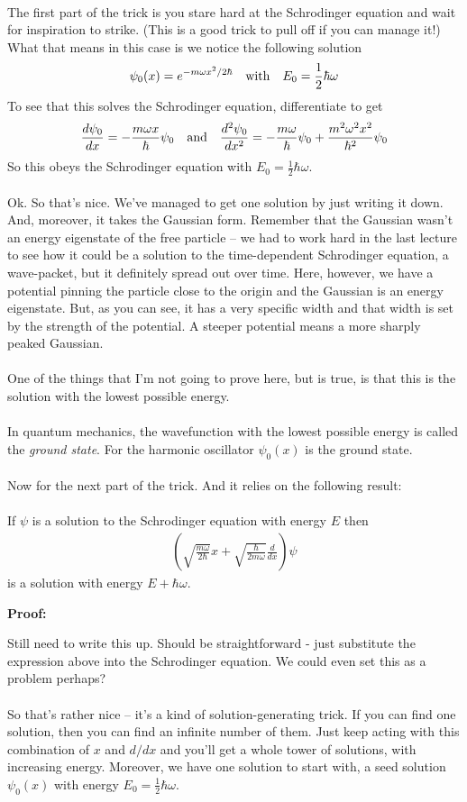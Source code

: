 \documentclass[12pt]{article}
\def\be{\begin{eqnarray}}
\def\ee{\end{eqnarray}}
\newcommand{\nn}{\nonumber}
\newcommand\para{\paragraph{}}
\newcommand{\ft}[2]{{\textstyle\frac{#1}{#2}}}
\newcommand{\co}{\color{olive}}
\newcommand{\cblue}{\color{blue}}
\begin{document}
\para
The first part of the trick is you stare hard at the Schrodinger equation and wait for inspiration to strike. (This is a good trick to pull off if you can manage it!) What that means in this case is {\co we notice the following solution
%
\be \psi_0(x) = e^{-m\omega x^2/2\hbar} \ \ \ {\rm with}\ \ \ E_0=\frac{1}{2}\hbar\omega\nn\ee
%
}To see that this solves the Schrodinger equation, differentiate to get {\co
%
\be \frac{d\psi_0}{dx} = -\frac{m\omega x}{\hbar}\psi_0\ \ \ {\rm and}\ \ \ \frac{d^2\psi_0}{dx^2} = -\frac{m\omega}{\hbar}\psi_0 + \frac{m^2\omega^2 x^2}{\hbar^2}\psi_0\nn\ee
%
So this obeys the Schrodinger equation with $E_0=\ft 12 \hbar \omega$.}

\para
Ok. So that's nice. We've managed to get one solution by just writing it down. And, moreover, it takes the Gaussian form. Remember that the Gaussian wasn't an energy eigenstate of the free particle -- we had to work hard in the last lecture to see how it could be a solution to the time-dependent Schrodinger equation, a wave-packet, but it definitely spread out over time. Here, however, we have a potential pinning the particle close to the origin and the Gaussian is an energy eigenstate. But, as you can see, it has a very specific width and that width is set by the strength of the potential. A steeper potential means a more sharply peaked Gaussian. 

\para

One of the things that I'm not going to prove here, but is true, is that this is the solution with the lowest possible energy. 

\para
{\co In quantum mechanics, the wavefunction with the lowest possible energy is called the {\it ground state}. For the harmonic oscillator $\psi_0(x)$ is the ground state.}

\para 
Now for the next part of the trick. And it relies on the following result:

\para
{\co {\bf Claim:} If $\psi$ is a solution to the Schrodinger equation with energy $E$ then
%
\be \left(\sqrt{\frac{m\omega}{2\hbar}}x +\sqrt{\frac{\hbar}{2m\omega}}\frac{d}{dx}\right)\psi \nn \ee
%
is a solution with energy $E+\hbar \omega$.

\vskip 3mm
\noindent
{\bf Proof:}} {\cblue Still need to write this up. Should be straightforward - just substitute the expression above into the Schrodinger equation. We could even set this as a problem perhaps?}

\para
So that's rather nice -- it's a kind of solution-generating trick. If you can find one solution, then you can find an infinite number of them. Just keep acting with this combination of $x$ and $d/dx$ and you'll get a whole tower of solutions, with increasing energy. Moreover, we have one solution to start with, a seed solution $\psi_0(x)$ with energy $E_0=\ft12 \hbar \omega$. 
\end{document}

